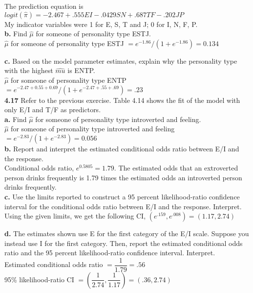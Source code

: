 \documentclass[paper=letter, fontsize=11pt]{scrartcl} %
\begin{document}
The prediction equation is $logit(\hat{\pi}) = -2.467+.555 EI - .0429 SN + .687 TF - .202 JP$
\\
My indicator variables were 1 for E, S, T and J; 0 for I, N, F, P. \\

\textbf{b.} Find $\hat{\mu}$ for someone of personality type ESTJ. \\
$\hat{\mu}$ for someone of personality type ESTJ $= e^{-1.86}/(1+e^{-1.86}) = 0.134$

\textbf{c.} Based on the model parameter estimates, explain why the personality type 
with the highest $\hat{mu}$ is ENTP. \\
$\hat{\mu}$ for someone of personality type ENTP $=e^{-2.47+0.55+0.69}/(1+e^{-2.47+.55+.69}) = .23$
\\

\textbf{4.17} Refer to the previous exercise. Table 4.14 shows the fit of the model with only E/I and T/F as predictors. \\

\textbf{a.} Find $\hat{\mu}$ for someone of personality type introverted and feeling. \\
$\hat{\mu}$ for someone of personality type introverted and feeling 
$= e^{-2.83}/(1+e^{-2.83}) = 0.056$
\\

\textbf{b.} Report and interpret the estimated conditional odds ratio between E/I and
the response. \\
Conditional odds ratio, $e^{0.5805} = 1.79$.
The estimated odds that an extroverted person drinks frequently is 1.79 times the estimated odds
an introverted person drinks frequently.
\\

\textbf{c.} Use the limits reported to construct a 95 percent likelihood-ratio confidence
interval for the conditional odds ratio between E/I and the response. Interpret. \\
Using the given limits, we get the following CI, $(e^{.159}, e^{.008}) = (1.17,2.74)$


\textbf{d.} The estimates shown use E for the first category of the E/I scale. Suppose
you instead use I for the first category. Then, report the estimated conditional odds ratio and the 95 percent likelihood-ratio confidence interval. Interpret. \\
Estimated conditional odds ratio $= \dfrac{1}{1.79}= .56$ \\
95\% likelihood-ratio CI $= (\dfrac{1}{2.74},\dfrac{1}{1.17}) = (.36, 2.74)$
\\
\end{document}
